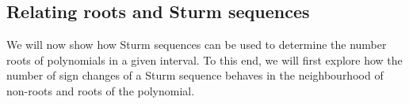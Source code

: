\documentclass[11pt,a4paper,oneside]{article}
\newtheorem{lemma}[definition]{Lemma}
\newcommand{\RR}{\mathbb{R}}
\begin{document}

\subsection{Relating roots and Sturm sequences}
\label{sec:roots_sturm}

We will now show how Sturm sequences can be used to determine the number roots of polynomials in a given interval. To this end, we will first explore how the number of sign changes of a Sturm sequence behaves in the neighbourhood of non-roots and roots of the polynomial.\\
\end{document}
